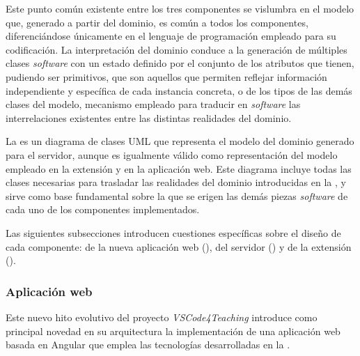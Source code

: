 Este punto común existente entre los tres componentes se vislumbra en el modelo que, generado a partir del dominio, es común a todos los componentes, diferenciándose únicamente en el lenguaje de programación empleado para su codificación. La interpretación del dominio conduce a la generación de múltiples clases \textit{software} con un estado definido por el conjunto de los atributos que tienen, pudiendo ser primitivos, que son aquellos que permiten reflejar información independiente y específica de cada instancia concreta, o de los tipos de las demás clases del modelo, mecanismo empleado para traducir en \textit{software} las interrelaciones existentes entre las distintas realidades del dominio.

La  es un diagrama de clases UML que representa el modelo del dominio generado para el servidor, aunque es igualmente válido como representación del modelo empleado en la extensión y en la aplicación web. Este diagrama incluye todas las clases necesarias para trasladar las realidades del dominio introducidas en la , y sirve como base fundamental sobre la que se erigen las demás piezas \textit{software} de cada uno de los componentes implementados.

Las siguientes subsecciones introducen cuestiones específicas sobre el diseño de cada componente: de la nueva aplicación web (), del servidor () y de la extensión ().

\subsubsection{Aplicación web}
\label{subsec:diseñoAppWeb}
Este nuevo hito evolutivo del proyecto \textit{VSCode4Teaching} introduce como principal novedad en su arquitectura la implementación de una aplicación web basada en Angular que emplea las tecnologías desarrolladas en la . 

